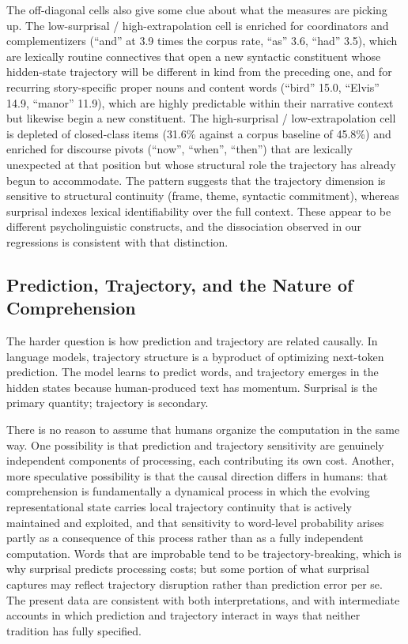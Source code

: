 \documentclass[12pt]{article}
\newcommand{\new}[1]{#1}   %
\begin{document}
The off-diagonal cells also give some clue about what the measures are picking up. The low-surprisal / high-extrapolation cell is enriched for coordinators and complementizers (\new{``and'' at 3.9 times the corpus rate, ``as'' 3.6, ``had'' 3.5}), which are lexically routine connectives that open a new syntactic constituent whose hidden-state trajectory will be different in kind from the preceding one\new{, and for recurring story-specific proper nouns and content words (``bird'' 15.0, ``Elvis'' 14.9, ``manor'' 11.9), which are highly predictable within their narrative context but likewise begin a new constituent}. The high-surprisal / low-extrapolation cell is \new{depleted of closed-class items (31.6\% against a corpus baseline of 45.8\%) and enriched for} discourse pivots (\new{``now'', ``when'',} ``then''\new{)} that are lexically unexpected at that position but whose structural role the trajectory has already begun to accommodate. The pattern suggests that the trajectory dimension is sensitive to structural continuity (frame, theme, syntactic commitment), whereas surprisal indexes lexical identifiability over the full context. These appear to be different psycholinguistic constructs, and the dissociation observed in our regressions is consistent with that distinction.

\subsection{Prediction, Trajectory, and the Nature of Comprehension}

The harder question is how prediction and trajectory are related causally. In language models, trajectory structure is a byproduct of optimizing next-token prediction. The model learns to predict words, and trajectory emerges in the hidden states because human-produced text has momentum. Surprisal is the primary quantity; trajectory is secondary.

There is no reason to assume that humans organize the computation in the same way. One possibility is that prediction and trajectory sensitivity are genuinely independent components of processing, each contributing its own cost. Another, more speculative possibility is that the causal direction differs in humans: that comprehension is fundamentally a dynamical process in which the evolving representational state carries local trajectory continuity that is actively maintained and exploited, and that sensitivity to word-level probability arises partly as a consequence of this process rather than as a fully independent computation. Words that are improbable tend to be trajectory-breaking, which is why surprisal predicts processing costs; but some portion of what surprisal captures may reflect trajectory disruption rather than prediction error per se. The present data are consistent with both interpretations, and with intermediate accounts in which prediction and trajectory interact in ways that neither tradition has fully specified.
\end{document}
